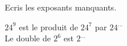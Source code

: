 %
%
Ecris les exposants manquants.
	
	$24^9$ est le produit de $24^7$ par $24^{\dots}$
	\\Le double de $2^6$ est $2^{\dots}$
